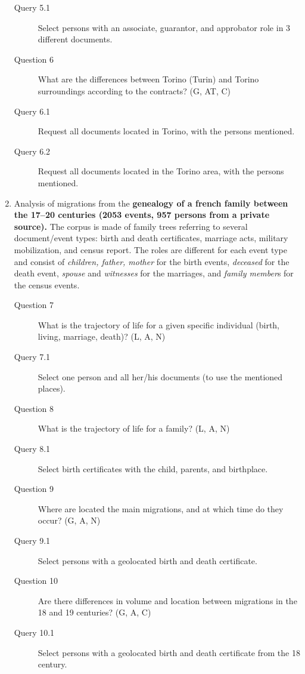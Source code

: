 \begin{enumerate}
\begin{footnotesize}
\begin{description}
    \item[\myindent Query 5.1] Select persons with an associate, guarantor, and approbator role in 3 different documents.
    \item[Question 6] What are the differences between Torino (Turin) and Torino surroundings according to the contracts? (G, AT, C)
    \item[\myindent Query 6.1] Request all documents located in Torino, with the persons mentioned.
    \item[\myindent Query 6.2] Request all documents located in the Torino area, with the persons mentioned.
    \end{description}
    \end{footnotesize}

    \item Analysis of migrations from the \textbf{genealogy of a french family between the 17--20 centuries (2053 events, 957 persons from a private source).}
    The corpus is made of family trees referring to several document/event types: birth and death certificates, marriage acts, military mobilization, and census report. The roles are different for each event type and consist of \textit{children, father, mother} for the birth events, \textit{deceased} for the death event, \textit{spouse} and \textit{witnesses} for the marriages, and \textit{family member}s for the census events.
    \begin{footnotesize}
    \begin{description}
    \item[Question 7] What is the trajectory of life for a given specific individual  (birth, living, marriage, death)? (L, A, N)
    \item[\myindent Query 7.1] Select one person and all her/his documents (to use the mentioned places).
    \item[Question 8] What is the trajectory of life for a family? (L, A, N)
    \item[\myindent Query 8.1] Select birth certificates with the child, parents, and birthplace.
    \item[Question 9] Where are located the main migrations, and at which time do they occur? (G, A, N)
    \item[\myindent Query 9.1] Select persons with a geolocated birth and death certificate.
    \item[Question 10] Are there differences in volume and location between migrations in the 18 and 19 centuries? (G, A, C)
    \item[\myindent Query 10.1] Select persons with a geolocated birth and death certificate from the 18 century.

\end{description}
\end{footnotesize}
\end{enumerate}

